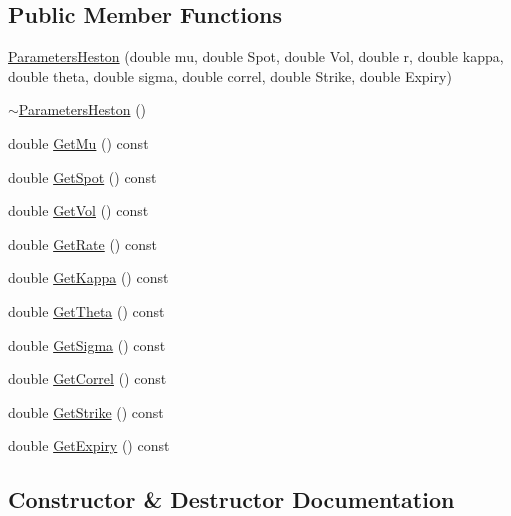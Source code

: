 \subsection*{Public Member Functions}
\begin{DoxyCompactItemize}
\item 
\hyperlink{classParametersHeston_a8187916d8d05985e8ed3218d4920b018}{Parameters\+Heston} (double mu, double Spot, double Vol, double r, double kappa, double theta, double sigma, double correl, double Strike, double Expiry)
\item 
\hyperlink{classParametersHeston_a94ec1ac10e605de7146975e832cc2224}{$\sim$\+Parameters\+Heston} ()
\item 
double \hyperlink{classParametersHeston_ae0c438d9defb44345c803fcf567e1efc}{Get\+Mu} () const
\item 
double \hyperlink{classParametersHeston_a8b36e32042bd59f2231249c3660016ef}{Get\+Spot} () const
\item 
double \hyperlink{classParametersHeston_a5b59a5d1acaeb5af6ac7135d5ddfbe9a}{Get\+Vol} () const
\item 
double \hyperlink{classParametersHeston_af9ac94714b15a7f8fcdc6d5fb3fc30e1}{Get\+Rate} () const
\item 
double \hyperlink{classParametersHeston_acea97934c0971b431042f5c668f2c5fa}{Get\+Kappa} () const
\item 
double \hyperlink{classParametersHeston_a29677f9499c18a64d0c583fa28abced6}{Get\+Theta} () const
\item 
double \hyperlink{classParametersHeston_a787a601a3e885d3e09d6a4eb71547ae8}{Get\+Sigma} () const
\item 
double \hyperlink{classParametersHeston_a690e2f7928173c82e304eab1fb91fc08}{Get\+Correl} () const
\item 
double \hyperlink{classParametersHeston_a6da0ebecb60d4580944224dd8b7de30f}{Get\+Strike} () const
\item 
double \hyperlink{classParametersHeston_a76212feaa625ee28ad2be65fb6f0c8ec}{Get\+Expiry} () const
\end{DoxyCompactItemize}


\subsection{Constructor \& Destructor Documentation}
\hypertarget{classParametersHeston_a8187916d8d05985e8ed3218d4920b018}{}\label{classParametersHeston_a8187916d8d05985e8ed3218d4920b018} 
